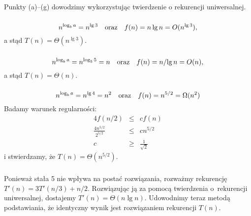 \subsection{} %
Punkty (a)--(g) dowodzimy wykorzystując twierdzenie o rekurencji uniwersalnej.

\subsubsection{} %
\[
	n^{\log_ba} = n^{\lg3} \quad\hbox{oraz}\quad f(n) = n\lg n = O(n^{\lg3}),
\]
a stąd $T(n)=\Theta(n^{\lg3})$.

\subsubsection{} %
\[
	n^{\log_ba} = n^{\log_55} = n \quad\hbox{oraz}\quad f(n) = n/\!\lg n = O(n),
\]
a stąd $T(n)=\Theta(n)$.

\subsubsection{} %
\[
	n^{\log_ba} = n^{\lg 4} = n^2 \quad\hbox{oraz}\quad f(n) = n^{5/2} = \Omega(n^2)
\]
Badamy warunek regularności:
\begin{eqnarray*}
	4f(n/2) &\le& cf(n) \\
	\frac{4n^{5/2}}{2^{5/2}} &\le& cn^{5/2} \\
	c &\ge& \frac{1}{\sqrt{2}}
\end{eqnarray*}
i stwierdzamy, że $T(n)=\Theta(n^{5/2})$.

\subsubsection{} %
Ponieważ stała 5 nie wpływa na postać rozwiązania, rozważmy rekurencję $T'(n)=3T'(n/3)+n/2$. Rozwiązując ją za pomocą twierdzenia o~rekurencji uniwersalnej, dostajemy $T'(n)=\Theta(n\lg n)$. Udowodnimy teraz metodą podstawiania, że identyczny wynik jest rozwiązaniem rekurencji $T(n)$.


